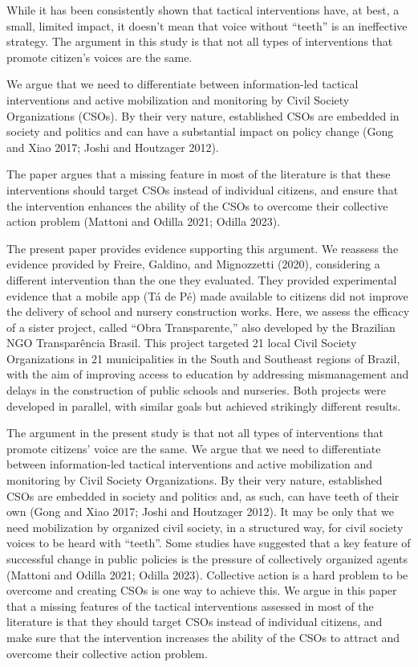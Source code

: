 \documentclass[]{AEA}
\begin{document}
While it has been consistently shown that tactical interventions have,
at best, a small, limited impact, it doesn't mean that voice without
``teeth'' is an ineffective strategy. The argument in this study is that
not all types of interventions that promote citizen's voices are the
same.

We argue that we need to differentiate between information-led tactical
interventions and active mobilization and monitoring by Civil Society
Organizations (CSOs). By their very nature, established CSOs are
embedded in society and politics and can have a substantial impact on
policy change (Gong and Xiao 2017; Joshi and Houtzager 2012).

The paper argues that a missing feature in most of the literature is
that these interventions should target CSOs instead of individual
citizens, and ensure that the intervention enhances the ability of the
CSOs to overcome their collective action problem (Mattoni and Odilla
2021; Odilla 2023).

The present paper provides evidence supporting this argument. We
reassess the evidence provided by Freire, Galdino, and Mignozzetti
(2020), considering a different intervention than the one they
evaluated. They provided experimental evidence that a mobile app (Tá de
Pé) made available to citizens did not improve the delivery of school
and nursery construction works. Here, we assess the efficacy of a sister
project, called ``Obra Transparente,'' also developed by the Brazilian
NGO Transparência Brasil. This project targeted 21 local Civil Society
Organizations in 21 municipalities in the South and Southeast regions of
Brazil, with the aim of improving access to education by addressing
mismanagement and delays in the construction of public schools and
nurseries. Both projects were developed in parallel, with similar goals
but achieved strikingly different results.

The argument in the present study is that not all types of interventions
that promote citizens' voice are the same. We argue that we need to
differentiate between information-led tactical interventions and active
mobilization and monitoring by Civil Society Organizations. By their
very nature, established CSOs are embedded in society and politics and,
as such, can have teeth of their own (Gong and Xiao 2017; Joshi and
Houtzager 2012). It may be only that we need mobilization by organized
civil society, in a structured way, for civil society voices to be heard
with ``teeth''. Some studies have suggested that a key feature of
successful change in public policies is the pressure of collectively
organized agents (Mattoni and Odilla 2021; Odilla 2023). Collective
action is a hard problem to be overcome and creating CSOs is one way to
achieve this. We argue in this paper that a missing features of the
tactical interventions assessed in most of the literature is that they
should target CSOs instead of individual citizens, and make sure that
the intervention increases the ability of the CSOs to attract and
overcome their collective action problem.
\end{document}
